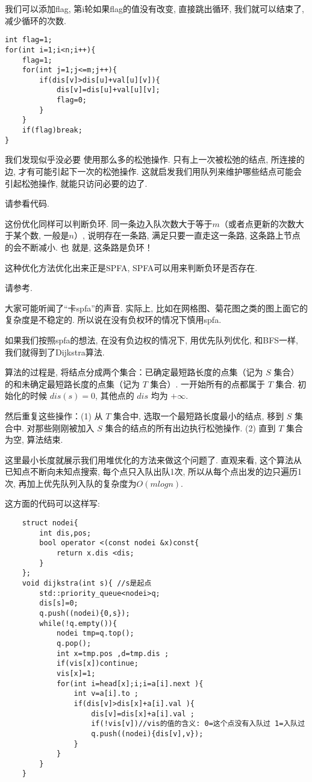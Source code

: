  我们可以添加flag, 第i轮如果flag的值没有改变, 直接跳出循环, 
我们就可以结束了, 减少循环的次数. 
\begin{lstlisting}
int flag=1;
for(int i=1;i<n;i++){
    flag=1;
    for(int j=1;j<=m;j++){
        if(dis[v]>dis[u]+val[u][v]){
            dis[v]=dis[u]+val[u][v];
            flag=0;
        }
    }
    if(flag)break;
}    
\end{lstlisting}

 我们发现似乎没必要
使用那么多的松弛操作. 只有上一次被松弛的结点, 所连接的边, 才有可能引起下一次的松弛操作. 
这就启发我们用队列来维护哪些结点可能会引起松弛操作, 就能只访问必要的边了. 

 请参看代码. 

这份优化同样可以判断负环. 同一条边入队次数大于等于$m$（或者点更新的次数大于某个数, 一般是$n$）, 
说明存在一条路, 满足只要一直走这一条路, 这条路上节点的会不断减小. 也
就是, 这条路是负环！

这种优化方法优化出来正是SPFA, SPFA可以用来判断负环是否存在. 

 请参考.

大家可能听闻了``卡spfa''的声音. 实际上, 比如在网格图、菊花图之类的图上面它的复杂度是不稳定的. 
所以说在没有负权环的情况下慎用spfa. 

 如果我们按照spfa的想法, 在没有负边权的情况下, 用优先队列优化, 
和BFS一样, 我们就得到了Dijkstra算法. 

算法的过程是, 将结点分成两个集合：已确定最短路长度的点集（记为 $S$ 集合）
的和未确定最短路长度的点集（记为 $T$ 集合）. 一开始所有的点都属于 $T$ 集合. 
初始化的时候 $dis(s)=0$, 其他点的 $dis$ 均为 $+\infty$. 

然后重复这些操作：(1) 从 $T$ 集合中, 选取一个最短路长度最小的结点, 移到 $S$ 集合中. 
对那些刚刚被加入 $S$ 集合的结点的所有出边执行松弛操作. 
(2) 直到 $T$ 集合为空, 算法结束. 

这里最小长度就展示我们用堆优化的方法来做这个问题了. 直观来看, 这个算法从已知点不断向未知点搜索, 
每个点只入队出队1次, 所以从每个点出发的边只遍历1次, 再加上优先队列入队的复杂度为$O(mlogn)$. 

这方面的代码可以这样写: 

\begin{lstlisting}
    struct nodei{
        int dis,pos;
        bool operator <(const nodei &x)const{
            return x.dis <dis;
        }
    };
    void dijkstra(int s){ //s是起点
        std::priority_queue<nodei>q;
        dis[s]=0;
        q.push((nodei){0,s});
        while(!q.empty()){
            nodei tmp=q.top();
            q.pop();
            int x=tmp.pos ,d=tmp.dis ;
            if(vis[x])continue;
            vis[x]=1;
            for(int i=head[x];i;i=a[i].next ){
                int v=a[i].to ;
                if(dis[v]>dis[x]+a[i].val ){
                    dis[v]=dis[x]+a[i].val ;
                    if(!vis[v])//vis的值的含义: 0=这个点没有入队过 1=入队过
                    q.push((nodei){dis[v],v});
                }
            }
        }
    }    
\end{lstlisting}


